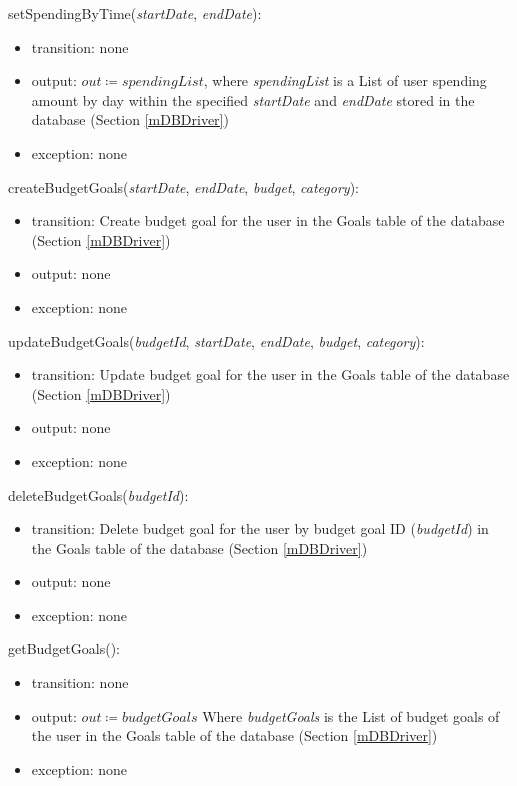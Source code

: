 \documentclass[12pt, titlepage]{article}
\begin{document}
\noindent setSpendingByTime(\textit{startDate}, \textit{endDate}):
\begin{itemize}
\item transition: none
\item output: \( \textit{out} \coloneqq spendingList \), where \textit{spendingList} is a List of user spending amount by day within the specified \textit{startDate} and \textit{endDate} stored in the database (Section \ref{mDBDriver})
\item exception: none
\end{itemize}

\noindent createBudgetGoals(\textit{startDate}, \textit{endDate}, \textit{budget}, \textit{category}):
\begin{itemize}
\item transition: Create budget goal for the user in the Goals table of the database (Section \ref{mDBDriver})
\item output: none
\item exception: none
\end{itemize}

\noindent updateBudgetGoals(\textit{budgetId}, \textit{startDate}, \textit{endDate}, \textit{budget}, \textit{category}):
\begin{itemize}
\item transition: Update budget goal for the user in the Goals table of the database (Section \ref{mDBDriver})
\item output: none
\item exception: none
\end{itemize}

\noindent deleteBudgetGoals(\textit{budgetId}):
\begin{itemize}
\item transition: Delete budget goal for the user by budget goal ID (\textit{budgetId}) in the Goals table of the database (Section \ref{mDBDriver})
\item output: none
\item exception: none
\end{itemize}

\noindent getBudgetGoals():
\begin{itemize}
\item transition: none
\item output: \( \textit{out} \coloneqq budgetGoals \) Where \textit{budgetGoals} is the List of budget goals of the user in the Goals table of the database (Section \ref{mDBDriver})
\item exception: none
\end{itemize}
\end{document}
